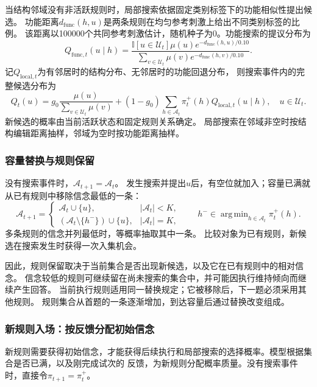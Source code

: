 \documentclass[11pt,a4paper]{article}
\numberwithin{equation}{section}
\newcommand{\ind}{\mathbb{I}}
\newcommand{\A}{\mathcal{A}}
\DeclareMathOperator*{\argmin}{arg\,min}
\begin{document}
当结构邻域没有非活跃规则时，局部搜索依据固定类别标签下的功能相似性提出候选。
功能距离$d_{\mathrm{func}}(h,u)$是两条规则在均匀参考刺激上给出不同类别标签的比例。
该距离以100000个共同参考刺激估计，随机种子为0。功能搜索的提议分布为
\begin{equation}
Q_{\mathrm{func},t}(u\mid h)=
\frac{\ind[u\in\mathcal U_t]\mu(u)e^{-d_{\mathrm{func}}(h,u)/0.10}}
{\sum_{v\in\mathcal U_t}\mu(v)e^{-d_{\mathrm{func}}(h,v)/0.10}}.
\end{equation}
记$Q_{\mathrm{local},t}$为有邻居时的结构分布、无邻居时的功能回退分布，
则搜索事件内的完整候选分布为
\begin{equation}
Q_t(u)=g_0\frac{\mu(u)}{\sum_{v\in\mathcal U_t}\mu(v)}
+(1-g_0)\sum_{h\in\A_t}\pi_t^+(h)Q_{\mathrm{local},t}(u\mid h),
\quad u\in\mathcal U_t.
\label{eq:proposal}
\end{equation}
新候选的概率由当前活跃状态和固定规则关系确定。
局部搜索在邻域非空时按结构编辑距离抽样，邻域为空时按功能距离抽样。

\subsubsection{容量替换与规则保留}
\label{sec:replacement}
没有搜索事件时，$\A_{t+1}=\A_t$。
发生搜索并提出$u$后，有空位就加入；容量已满就从已有规则中移除信念最低的一条：
\begin{equation}
\A_{t+1}=\begin{cases}
\A_t\cup\{u\},&|\A_t|<K,\\
(\A_t\setminus\{h^-\})\cup\{u\},&|\A_t|=K,
\end{cases}
\qquad h^-\in\argmin_{h\in\A_t}\pi_t^+(h).
\label{eq:replacement}
\end{equation}
多条规则的信念并列最低时，等概率抽取其中一条。
比较对象为已有规则，新候选在搜索发生时获得一次入集机会。

因此，规则保留取决于当前集合是否出现新候选，以及它在已有规则中的相对信念。
信念较低的规则可继续留在尚未搜索的集合中，并可能因执行维持倾向而继续产生回答。
当前执行规则适用同一替换规定；它被移除后，下一题必须采用其他规则。
规则集合从首题的一条逐渐增加，到达容量后通过替换改变组成。


\subsubsection{新规则入场：按反馈分配初始信念}
\label{sec:admission}
新规则需要获得初始信念，才能获得后续执行和局部搜索的选择概率。模型根据集合是否已满，以及刚完成试次的
反馈，为新规则分配概率质量。没有搜索事件时，直接令$\pi_{t+1}=\pi_t^+$。
\end{document}
